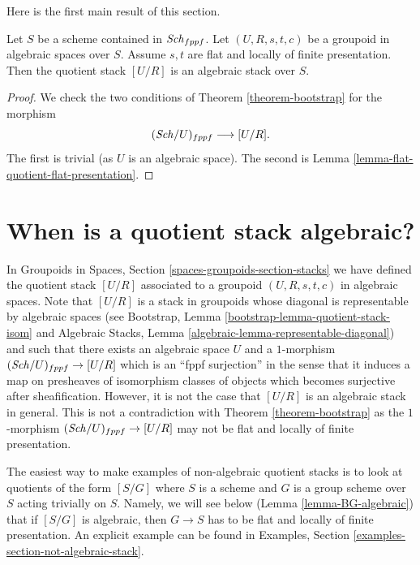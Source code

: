 \noindent
Here is the first main result of this section.

\begin{theorem}
\label{theorem-flat-groupoid-gives-algebraic-stack}
Let $S$ be a scheme contained in $\mathit{Sch}_{fppf}$.
Let $(U, R, s, t, c)$ be a groupoid in algebraic spaces over $S$.
Assume $s, t$ are flat and locally of finite presentation.
Then the quotient stack $[U/R]$ is an algebraic stack over $S$.
\end{theorem}

\begin{proof}
We check the two conditions of
Theorem \ref{theorem-bootstrap}
for the morphism
$$
(\mathit{Sch}/U)_{fppf} \longrightarrow [U/R].
$$
The first is trivial (as $U$ is an algebraic space).
The second is
Lemma \ref{lemma-flat-quotient-flat-presentation}.
\end{proof}









\section{When is a quotient stack algebraic?}
\label{section-quotient-algebraic}

\noindent
In
Groupoids in Spaces, Section \ref{spaces-groupoids-section-stacks}
we have defined the quotient stack $[U/R]$ associated to a groupoid
$(U, R, s, t, c)$ in algebraic spaces. Note that $[U/R]$ is a stack
in groupoids whose diagonal is representable by algebraic spaces (see
Bootstrap, Lemma \ref{bootstrap-lemma-quotient-stack-isom}
and
Algebraic Stacks, Lemma \ref{algebraic-lemma-representable-diagonal})
and such that there exists an algebraic space $U$ and a $1$-morphism
$(\mathit{Sch}/U)_{fppf} \to [U/R]$ which is an ``fppf surjection''
in the sense that it induces a map on presheaves of isomorphism classes of
objects which becomes surjective after sheafification.
However, it is not the case that $[U/R]$ is an algebraic
stack in general. This is not a contradiction with
Theorem \ref{theorem-bootstrap}
as the $1$-morphism $(\mathit{Sch}/U)_{fppf} \to [U/R]$ may not
be flat and locally of finite presentation.

\medskip\noindent
The easiest way to make examples of non-algebraic quotient stacks is
to look at quotients of the form $[S/G]$ where $S$ is a scheme and $G$
is a group scheme over $S$ acting trivially on $S$. Namely, we will see
below
(Lemma \ref{lemma-BG-algebraic})
that if $[S/G]$ is algebraic, then $G \to S$ has to be flat and locally
of finite presentation. An explicit example can be found in
Examples, Section \ref{examples-section-not-algebraic-stack}.

